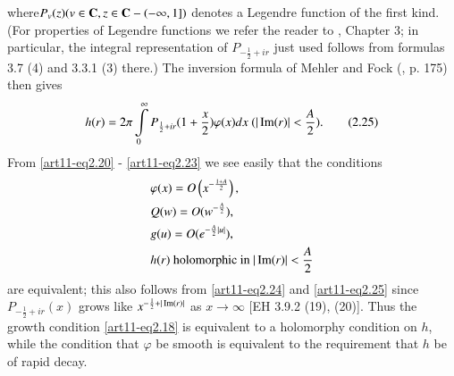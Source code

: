 where\pageoriginale $P_v (z) (v \in\mathbf{C}, z \in \mathbf{C} - (- \infty, 1])$
denotes a Legendre function of the first kind. (For properties of
Legendre functions we refer the reader to \cite{art11-EH}, Chapter 3;
in particular, the integral representation of $P_{-\frac{1}{2} + ir}$
just used follows from formulas 3.7 (4) and 3.3.1 (3) there.) The
inversion formula of Mehler and Fock (\cite{art11-EH}, p. 175) then gives 
\begin{equation*}
h(r) = 2 \pi \int\limits^\infty_0 P_{\frac{1}{2} +ir} (1+ \frac{x}{2}) \varphi (x) dx ~~ (|\operatorname{Im} (r) |<\frac{A}{2}).
\tag{2.25}\label{art11-eq2.25}
\end{equation*}
From \eqref{art11-eq2.20} - \eqref{art11-eq2.23} we see easily that the conditions 
\begin{align*}
& \varphi (x) = O \left(x^{-\frac{1+A}{2}} \right), \\
& Q (w) = O(w^{-\frac{A}{2}}), \\
& g (u) = O(e^{-\frac{A}{2}|u|}),\\
& h(r) \text{ holomorphic in } |\operatorname{Im} (r)| <\frac{A}{2}
\end{align*}
are equivalent; this also follows from \eqref{art11-eq2.24} and \eqref{art11-eq2.25} since $P_{-\frac{1}{2} + ir} (x)$ grows like $x^{-\frac{1}{2} + |\operatorname{Im} (r)|}$ as $x \to \infty$ [EH 3.9.2 (19), (20)]. Thus the growth condition \eqref{art11-eq2.18} is equivalent to a holomorphy condition on $h$, while the condition that $\varphi$ be smooth is equivalent to the requirement that $h$ be of rapid decay.

